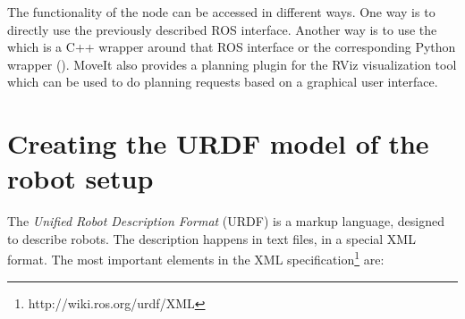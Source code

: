 The functionality of the  node can be accessed in different ways. One way is to directly use the previously described ROS interface. Another way is to use the  which is a C++ wrapper around that ROS interface or the corresponding Python wrapper (). MoveIt also provides a planning plugin for the RViz visualization tool which can be used to do planning requests based on a graphical user interface.

\section{Creating the URDF model of the robot setup}
\label{sec:urdf}

The \emph{Unified Robot Description Format} (URDF) is a markup language, designed to describe robots. The description happens in text files, in a special XML format. The most important elements in the XML specification\footnote{http://wiki.ros.org/urdf/XML} are:

